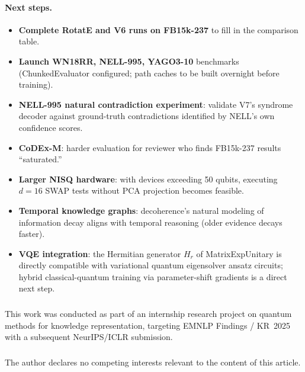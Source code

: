 \documentclass[runningheads]{llncs}
\begin{document}
\paragraph{Next steps.}
\begin{itemize}
  \item \textbf{Complete RotatE and V6 runs on FB15k-237} to fill in the
    comparison table.
  \item \textbf{Launch WN18RR, NELL-995, YAGO3-10} benchmarks (ChunkedEvaluator
    configured; path caches to be built overnight before training).
  \item \textbf{NELL-995 natural contradiction experiment}: validate V7's
    syndrome decoder against ground-truth contradictions identified by NELL's
    own confidence scores.
  \item \textbf{CoDEx-M}: harder evaluation for reviewer who finds FB15k-237
    results ``saturated.''
  \item \textbf{Larger NISQ hardware}: with devices exceeding 50 qubits,
    executing $d=16$ SWAP tests without PCA projection becomes feasible.
  \item \textbf{Temporal knowledge graphs}: decoherence's natural modeling of
    information decay aligns with temporal reasoning (older evidence decays
    faster).
  \item \textbf{VQE integration}: the Hermitian generator $H_r$ of
    MatrixExpUnitary is directly compatible with variational quantum
    eigensolver ansatz circuits; hybrid classical-quantum training via
    parameter-shift gradients is a direct next step.
\end{itemize}

\begin{credits}
\subsubsection{\ackname}
This work was conducted as part of an internship research project on quantum
methods for knowledge representation, targeting EMNLP Findings / KR~2025
with a subsequent NeurIPS/ICLR submission.

\subsubsection{\discintname}
The author declares no competing interests relevant to the content of this
article.
\end{credits}
\end{document}
